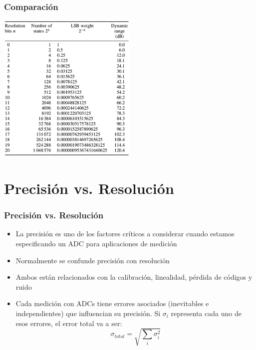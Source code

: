 \documentclass{beamer}
\begin{document}
\begin{frame}
\frametitle{Comparación}
\begin{center}
\includegraphics[width=0.5\textwidth]{d3/dinamic_range_adc}
\end{center}
\end{frame}

\section{Precisión vs. Resolución}

\begin{frame}
\frametitle{Precisión vs. Resolución}
\begin{block}{}
\begin{itemize}
\item La precisión es uno de los factores críticos a considerar cuando estamos
especificando un ADC para aplicaciones de medición  
\item Normalmente se confunde precisión con resolución
\item Ambos están relacionados con la calibración, linealidad, pérdida de
códigos y ruido 
\item Cada medición con ADCs tiene errores asociados ({\color{blue}inevitables e
independientes}) que influencian su precisión. Si $\sigma_i$ representa cada uno
de esos errores, el error total va a ser:
$$\sigma_{total} = \sqrt{\sum_i\sigma_i^2}$$  
\end{itemize}
\end{block}
\end{frame}
\end{document}
